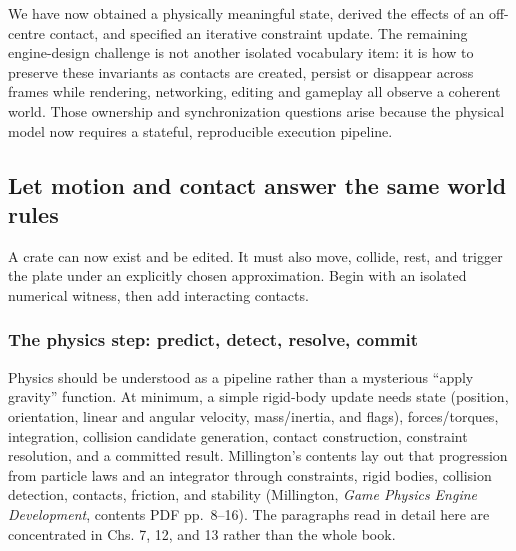 \hypertarget{06-engine-ii-ch033-how-the-next-engineering-problem-follows}{}

We have now obtained a physically meaningful state, derived the effects of an off-centre contact, and specified an iterative constraint update. The remaining engine-design challenge is not another isolated vocabulary item: it is how to preserve these invariants as contacts are created, persist or disappear across frames while rendering, networking, editing and gameplay all observe a coherent world. Those ownership and synchronization questions arise because the physical model now requires a stateful, reproducible execution pipeline.

\subsection{Let motion and contact answer the same world rules}\label{06-engine-ii-ch033-let-motion-and-contact-answer-the-same-world-rules}

\hypertarget{06-engine-ii-ch033-let-motion-and-contact-answer-the-same-world-rules}{}

A crate can now exist and be edited. It must also move, collide, rest, and trigger the plate under an explicitly chosen approximation. Begin with an isolated numerical witness, then add interacting contacts.

\subsubsection{The physics step: predict, detect, resolve, commit}\label{06-engine-ii-ch033-the-physics-step-predict-detect-resolve-commit}

\hypertarget{06-engine-ii-ch033-the-physics-step-predict-detect-resolve-commit}{}

Physics should be understood as a pipeline rather than a mysterious ``apply gravity'' function. At minimum, a simple rigid-body update needs state (position, orientation, linear and angular velocity, mass/inertia, and flags), forces/torques, integration, collision candidate generation, contact construction, constraint resolution, and a committed result. Millington's contents lay out that progression from particle laws and an integrator through constraints, rigid bodies, collision detection, contacts, friction, and stability (Millington, \emph{Game Physics Engine Development}, contents PDF pp.~8--16). The paragraphs read in detail here are concentrated in Chs. 7, 12, and 13 rather than the whole book.

